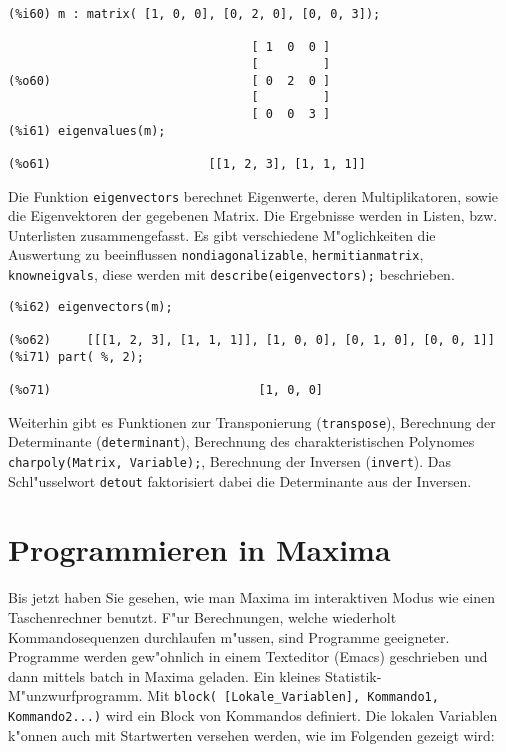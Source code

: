 \documentclass[spanish,12pt,a4paper]{article}
\begin{document}
\scriptsize
\begin{verbatim}
(%i60) m : matrix( [1, 0, 0], [0, 2, 0], [0, 0, 3]);

                                  [ 1  0  0 ]
                                  [         ]
(%o60)                            [ 0  2  0 ]
                                  [         ]
                                  [ 0  0  3 ]
(%i61) eigenvalues(m);

(%o61)                      [[1, 2, 3], [1, 1, 1]]
\end{verbatim}
\normalsize

Die Funktion \verb|eigenvectors| berechnet Eigenwerte, deren Multiplikatoren, sowie die Eigenvektoren der gegebenen Matrix. Die Ergebnisse werden in Listen, bzw. Unterlisten zusammengefasst. Es gibt verschiedene M"oglichkeiten die Auswertung zu beeinflussen \verb|nondiagonalizable|, \verb|hermitianmatrix|, \verb|knowneigvals|, diese werden mit \verb|describe(eigenvectors);| beschrieben.

\scriptsize
\begin{verbatim}
(%i62) eigenvectors(m);

(%o62)     [[[1, 2, 3], [1, 1, 1]], [1, 0, 0], [0, 1, 0], [0, 0, 1]]
(%i71) part( %, 2);

(%o71)                             [1, 0, 0]
\end{verbatim}
\normalsize

Weiterhin gibt es Funktionen zur Transponierung (\verb|transpose|), Berechnung der Determinante (\verb|determinant|), Berechnung des charakteristischen Polynomes \verb|charpoly(Matrix, Variable);|, Berechnung der Inversen (\verb|invert|). Das Schl"usselwort \verb|detout| faktorisiert dabei die Determinante aus der Inversen.


\section{Programmieren in Maxima}

Bis jetzt haben Sie gesehen, wie man Maxima im interaktiven Modus wie einen Taschenrechner benutzt. F"ur Berechnungen, welche wiederholt Kommandosequenzen durchlaufen m"ussen, sind Programme geeigneter.
Programme werden gew"ohnlich in einem Texteditor (Emacs) geschrieben und dann mittels batch in Maxima geladen.
Ein kleines Statistik-M"unzwurfprogramm. Mit \verb|block( [Lokale_Variablen], Kommando1, Kommando2...)| wird ein Block von Kommandos definiert. Die lokalen Variablen k"onnen auch mit Startwerten versehen werden, wie im Folgenden gezeigt wird:
\end{document}
